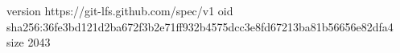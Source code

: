 version https://git-lfs.github.com/spec/v1
oid sha256:36fe3bd121d2ba672f3b2e71ff932b4575dcc3e8fd67213ba81b56656e82dfa4
size 2043
